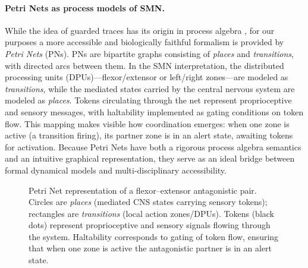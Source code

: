 \paragraph{Petri Nets as process models of SMN.}
While the idea of guarded traces has its origin in process algebra \citep{Dijkstra1975,BaetenWeijland1990}, 
for our purposes a more accessible and biologically faithful formalism is provided by \emph{Petri Nets} (PNs). 
PNs are bipartite graphs consisting of \emph{places} and \emph{transitions}, with directed arcs between them. 
In the SMN interpretation, the distributed processing units (DPUs)—flexor/extensor or left/right zones—are modeled as \emph{transitions}, 
while the mediated states carried by the central nervous system are modeled as \emph{places}. 
Tokens circulating through the net represent proprioceptive and sensory messages, with haltability implemented as gating conditions on token flow. 
This mapping makes visible how coordination emerges: when one zone is active (a transition firing), its partner zone is in an alert state, awaiting tokens for activation. 
Because Petri Nets have both a rigorous process algebra semantics and an intuitive graphical representation, they serve as an ideal bridge between formal dynamical models and multi-disciplinary accessibility.




\begin{figure}[t]
\centering
{}

\caption{Petri Net representation of a flexor--extensor antagonistic pair. 
Circles are \emph{places} (mediated CNS states carrying sensory tokens); 
rectangles are \emph{transitions} (local action zones/DPUs). 
Tokens (black dots) represent proprioceptive and sensory signals flowing through the system. 
Haltability corresponds to gating of token flow, ensuring that when one zone is active the antagonistic partner is in an alert state.}
\label{fig:pn-flexor-extensor}
\end{figure}

